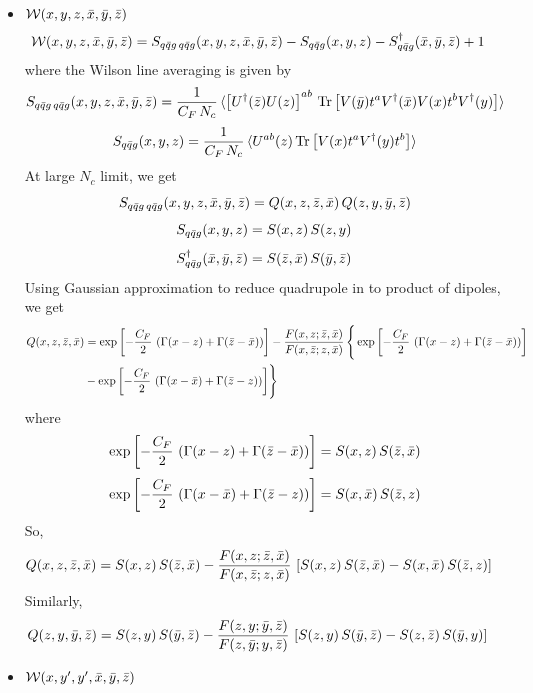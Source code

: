 \documentclass[9pt]{article}
\numberwithin{equation}{section}
\begin{document}
\begin{itemize}
    \item $\mathcal{W}(x,y,z,\Bar{x},\Bar{y},\Bar{z})$
    \begin{align}
        \mathcal{W}(x,y,z,\Bar{x},\Bar{y},\Bar{z}) & = S_{q\Bar{q}g\,q\Bar{q}g}(x,y,z,\Bar{x},\Bar{y},\Bar{z}) -S_{q\Bar{q}g}(x,y,z) - S^{\dagger}_{q\Bar{q}g}(\Bar{x},\Bar{y},\Bar{z}) + 1
    \end{align}
where the Wilson line averaging is given by 
$$S_{q\Bar{q}g\,q\Bar{q}g}(x,y,z,\Bar{x},\Bar{y},\Bar{z}) = \frac{1}{C_{F}\,N_{c}}\, \langle \left[U^{\dagger}(\Bar{z})U(z)\right]^{ab}\, \text{Tr}\left[V(\Bar{y})t^{a}V^{\dagger}(\Bar{x})V(x)t^{b}V^{\dagger}(y)\right] \rangle$$
$$S_{q\Bar{q}g}(x,y,z) =  \frac{1}{C_{F}\,N_{c}}\, \langle U^{ab}(z)\,\text{Tr}\left[V(x)t^{a}V^{\dagger}(y)t^{b}\right]\rangle$$
At large $N_{c}$ limit, we get
$$S_{q\Bar{q}g\,q\Bar{q}g}(x,y,z,\Bar{x},\Bar{y},\Bar{z}) = Q(x,z,\Bar{z},\Bar{x})\, Q(z,y,\Bar{y},\Bar{z})$$
$$S_{q\Bar{q}g}(x,y,z) = S(x,z)\, S(z,y)$$
$$S^{\dagger}_{q\Bar{q}g}(\Bar{x},\Bar{y},\Bar{z}) = S(\Bar{z},\Bar{x})\, S(\Bar{y},\Bar{z})$$
Using Gaussian approximation to reduce quadrupole in to product of dipoles, we get
\begin{align}
    Q(x,z,\Bar{z},\Bar{x}) & = \exp{\left[-\frac{C_{F}}{2}\,\left(\Gamma(x-z)+\Gamma(\Bar{z}-\Bar{x})\right)\right]}-\frac{F(x,z;\Bar{z},\Bar{x})}{F(x,\Bar{z};z,\Bar{x})}\,\Bigg\{\exp{\left[-\frac{C_{F}}{2}\,\left(\Gamma(x-z)+\Gamma(\Bar{z}-\Bar{x})\right)\right]}\notag \\ & -\exp{\left[-\frac{C_{F}}{2}\,\left(\Gamma(x-\Bar{x})+\Gamma(\Bar{z}-z)\right)\right]}\Bigg\}
\end{align}
where $$\exp{\left[-\frac{C_{F}}{2}\,\left(\Gamma(x-z)+\Gamma(\Bar{z}-\Bar{x})\right)\right]} = S(x,z)\,S(\Bar{z},\Bar{x})$$
$$\exp{\left[-\frac{C_{F}}{2}\,\left(\Gamma(x-\Bar{x})+\Gamma(\Bar{z}-z)\right)\right]} = S(x,\Bar{x})\, S(\Bar{z},z)$$
So, 
\begin{align}
    Q(x,z,\Bar{z},\Bar{x}) & = S(x,z)\,S(\Bar{z},\Bar{x}) - \frac{F(x,z;\Bar{z},\Bar{x})}{F(x,\Bar{z};z,\Bar{x})}\, \left[S(x,z)\,S(\Bar{z},\Bar{x})-S(x,\Bar{x})\, S(\Bar{z},z)\right]
\end{align}
Similarly, 
\begin{align}
    Q(z,y,\Bar{y},\Bar{z}) & = S(z,y)\,S(\Bar{y},\Bar{z}) - \frac{F(z,y;\Bar{y},\Bar{z})}{F(z,\Bar{y};y,\Bar{z})}\,\left[S(z,y)\,S(\Bar{y},\Bar{z})-S(z,\Bar{z})\,S(\Bar{y},y)\right]
\end{align}
\item $\mathcal{W}(x,y',y',\Bar{x},\Bar{y},\Bar{z})$

\end{itemize}
\end{document}
